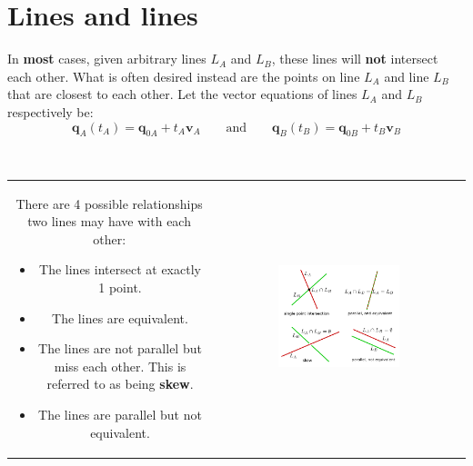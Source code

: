 \documentclass{article}
\begin{document}
\begin{itemize}
\end{itemize}




\section*{Lines and lines}

In {\bf most} cases, given arbitrary lines \(L_A\) and \(L_B\), these lines will {\bf not} intersect each other. What is often desired instead are the points on line \(L_A\) and line \(L_B\) that are closest to each other. Let the vector equations of lines \(L_A\) and \(L_B\) respectively be:
\[\mathbf{q}_A(t_A) = \mathbf{q}_{0A} + t_A \mathbf{v}_A \quad\quad\text{and}\quad\quad \mathbf{q}_B(t_B) = \mathbf{q}_{0B} + t_B \mathbf{v}_B\]

~\\ \begin{tabular}{cc}
\parbox{0.5\textwidth}{
There are 4 possible relationships two lines may have with each other:
\begin{itemize}
\item The lines intersect at exactly 1 point. 
\item The lines are equivalent. 
\item The lines are not parallel but miss each other. This is referred to as being {\bf skew}. 
\item The lines are parallel but not equivalent. 
\end{itemize}
} & \parbox{0.5\textwidth}{
\includegraphics[width = 0.5\textwidth]{line_line_intersections}
}
\end{tabular}
\end{document}
